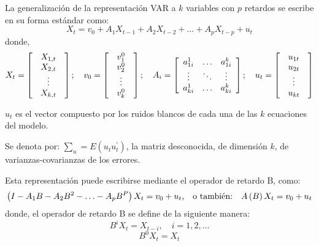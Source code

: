 La generalizaci\'{o}n de la representaci\'{o}n VAR a $k$ variables con $p$ retardos se escribe en su forma est\'{a}ndar como:
\[
X_{t}=v_{0}+A_{1}X_{t-1}+A_{2}X_{t-2}+\ldots +A_{p}X_{t-p}+u_{t}
\]
donde, 
\[
X_{t}=\left[ {\begin{array}{*{20}c}
X_{1,t}\\
{\begin{array}{*{20}c}
X_{2,t}\\
\vdots \\
\end{array} }\\
X_{k,t}\\
\end{array} } \right];\quad 
v_{0}=\left[ {\begin{array}{*{20}c}
{\begin{array}{*{20}c}
v_{1}^{0}\\
v_{2}^{0}\\
\vdots \\
\end{array} }\\
v_{k}^{0}\\
\end{array} } \right];\quad 
A_{i}=\left[ 
{\begin{array}{*{20}c}
a_{1i}^{1} & \mathellipsis & a_{1i}^{k}\\
\vdots & \ddots & \vdots \\
a_{ki}^{1} & \mathellipsis & a_{ki}^{k}\\
\end{array} } \right];\quad
u_{t}=\left[ 
{\begin{array}{*{20}c}
{\begin{array}{*{20}c}
u_{1t}\\
u_{2t}\\
\vdots \\
\end{array} }\\
u_{kt}\\
\end{array} } \right]
\]

$u_{t}$ es el vector compuesto por los ruidos blancos de cada una de las $k$ ecuaciones del modelo.\newline

Se denota por: $\sum\nolimits_u = E(u_{t}u_{t}^{'})$, la matriz desconocida, de dimensi\'{o}n $k$, de varianzas-covarianzas de los errores.\newline

Esta representaci\'{o}n puede escribirse mediante el operador de retardo B, como: 
\[
\left( I-A_{1}B-A_{2}B^{2}-\mathellipsis -A_{p}B^{P} \right)X_{t}=v_{0}+u_{t}\text{,\quad o tambi\'{e}n:\quad}
A\left( B \right)X_{t}=v_{0}+u_{t}
\]
donde, el operador de retardo B se define de la siguiente manera:
\[
B^{i}X_{t}=X_{t-i},\quad i=1,2,\ldots 
\]
\[
B^{0}X_{t}=X_{t}
\]

